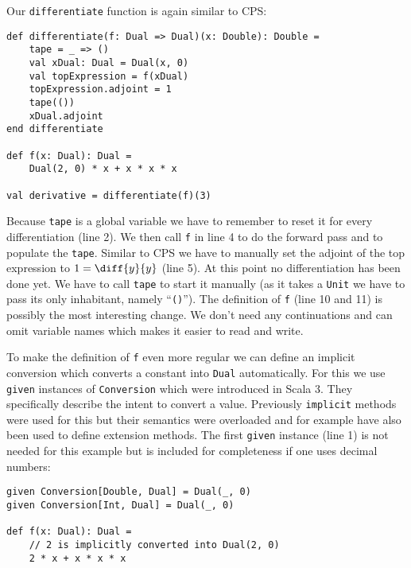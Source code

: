 Our \lstinline{differentiate} function is again similar to CPS:
\begin{lstlisting}
def differentiate(f: Dual => Dual)(x: Double): Double =
    tape = _ => ()
    val xDual: Dual = Dual(x, 0)
    val topExpression = f(xDual)
    topExpression.adjoint = 1
    tape(())
    xDual.adjoint
end differentiate

def f(x: Dual): Dual =
    Dual(2, 0) * x + x * x * x

val derivative = differentiate(f)(3)
\end{lstlisting}
Because \lstinline{tape} is a global variable we have to remember to reset it for every differentiation (line 2). We then call \lstinline{f} in line 4 to do the forward pass and to populate the \lstinline{tape}. Similar to CPS we have to manually set the adjoint of the top expression to $1 = \diff{y}{y}$ (line 5). At this point no differentiation has been done yet. We have to call \lstinline{tape} to start it manually (as it takes a \lstinline{Unit} we have to pass its only inhabitant, namely ``\lstinline{()}''). The definition of \lstinline{f} (line 10 and 11) is possibly the most interesting change. We don't need any continuations and can omit variable names which makes it easier to read and write. 

To make the definition of \lstinline{f} even more regular \todowording we can define an implicit conversion which converts a constant into \lstinline{Dual} automatically. For this we use \lstinline{given} instances of \lstinline{Conversion} which were introduced in Scala 3. They specifically describe the intent to convert a value. Previously \lstinline{implicit} methods were used for this but their semantics were overloaded and for example have also been used to define extension methods. The first \lstinline{given} instance (line 1) is not needed for this example but is included for completeness if one uses decimal numbers:
\begin{lstlisting}
given Conversion[Double, Dual] = Dual(_, 0)
given Conversion[Int, Dual] = Dual(_, 0)

def f(x: Dual): Dual =
    // 2 is implicitly converted into Dual(2, 0)
    2 * x + x * x * x
\end{lstlisting}

